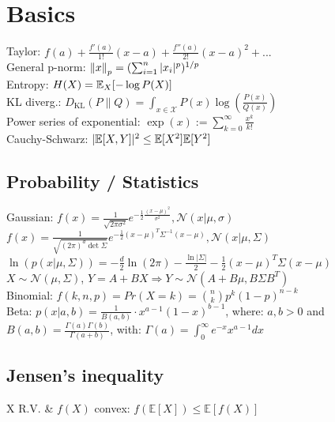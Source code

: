 \section{Basics}

Taylor: $f(a)+\tfrac{f'(a)}{1!}(x-a) + \tfrac{f''(a)}{2!}(x-a)^2 + ...$ \\
General p-norm: $\left\lVert x \right\rVert_p = (\sum_{i=1}^n |x_i|^p)^{1/p}$\\
Entropy: $H(X)=\mathbb E_X[-\log P(X)]$\\
KL diverg.: $D_\text{KL}(P \parallel Q) = \int_{x\in\mathcal{X}} P(x) \log\left(\frac{P(x)}{Q(x)}\right)$\\
Power series of exponential: $\exp(x) := \sum_{k = 0}^{\infty} \frac{x^k}{k!}$\\
Cauchy-Schwarz: $|\mathbb E[X,Y]|^2 \leq \mathbb E[X^2] \mathbb E[Y^2]$ 

\subsection*{Probability / Statistics}
Gaussian:
$f(x) = \frac{1}{\sqrt{2\pi \sigma^2}} e^{- \frac{1}{2} \frac{(x-\mu)^2}{\sigma^2}}, \mathcal{N}(x|\mu, \sigma)$\\
$f(x) = \frac{1}{\sqrt{(2\pi)^d\det\Sigma}} e^{- \frac{1}{2} (x-\mu)^T \Sigma^{-1} (x-\mu)}, \mathcal{N}(x|\mu, \Sigma)$\\
$\ln(p(x|\mu, \Sigma)) {=} {-}\tfrac{d}{2}\ln(2\pi) {-} \tfrac{\ln|\Sigma|}{2} {-} \tfrac{1}{2}(x{-}\mu)^T\Sigma(x{-}\mu)$ \\
$X {\sim} \mathcal{N}(\mu,\Sigma)$, $Y{=}A{+}BX \Rightarrow Y{\sim}\mathcal{N}(A{+}B\mu,B\Sigma B^T)$\\
Binomial: $f(k,n,p) {=} Pr(X=k) {=} \binom nk p^k (1{-}p)^{n{-}k}$\\
Beta: $p(x|a,b)=\frac{1}{B(a,b)}\cdot x^{a-1}(1-x)^{b-1}$, where: $a,b>0$ and $B(a,b)=\frac{\Gamma (a)\Gamma(b)}{\Gamma (a+b)}$, with: $\Gamma(a)=\int_0^\infty e^{-x}x^{a-1}dx$

\subsection*{Jensen's inequality}
	X R.V. \& $f(X)$ convex: $f(\mathbb{E}[X]) \leq \mathbb{E}[f(X)]$

